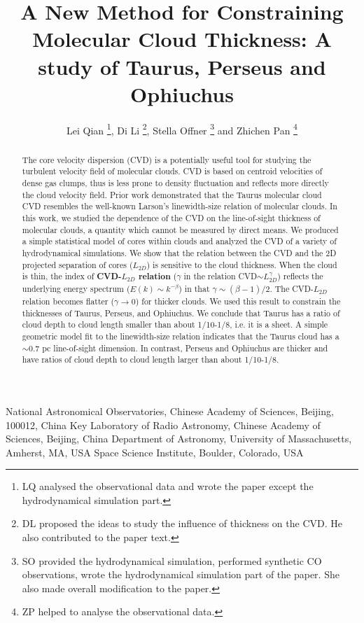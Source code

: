 \documentclass[iop,revtex4]{emulateapj}
\begin{document}
\slugcomment{}

 


\title{A New Method for Constraining Molecular Cloud Thickness: A study of Taurus, Perseus and Ophiuchus}



\author{ Lei Qian \footnote{LQ analysed the observational data and wrote the paper except the hydrodynamical simulation part.}, Di Li   \footnote{DL proposed the ideas to study the influence of thickness on the CVD. He also contributed to the paper text.}, Stella Offner \footnote{SO provided the hydrodynamical simulation, performed synthetic CO observations, wrote the hydrodynamical simulation part of the paper. She also made overall modification to the paper.} and Zhichen Pan \footnote{ZP helped to analyse the observational data.}}
\affil{}  {National Astronomical Observatories,
Chinese Academy of Sciences, Beijing, 100012, China}
 {Key Laboratory of Radio Astronomy, Chinese Academy of Sciences, Beijing, China}
 {Department of Astronomy, University of Massachusetts, Amherst, MA, USA}
 {Space Science Institute, Boulder, Colorado, USA}


\begin{abstract}
The core velocity dispersion (CVD) is a potentially useful tool for studying the turbulent velocity field of molecular clouds. CVD is based on centroid velocities of dense gas clumps, thus is less prone to density fluctuation and reflects more directly the cloud velocity field. Prior work demonstrated that the Taurus molecular cloud CVD resembles the well-known Larson's linewidth-size relation of molecular clouds. In this work, we studied the dependence of the CVD on the line-of-sight thickness of molecular clouds, a quantity which cannot be measured by direct means. We produced a simple statistical model of cores within clouds and analyzed the CVD of a variety of hydrodynamical simulations. We show that the relation between the CVD and the 2D projected separation of cores ($L_{2D}$) is sensitive to the cloud thickness. When the cloud is thin, the index of {\bf CVD-$L_{2D}$ relation} ($\gamma$ in the relation CVD$\sim L_{2D}^{\gamma}$) reflects the underlying energy spectrum ($E(k)\sim k^{-\beta}$) in that $\gamma\sim(\beta-1)/2$. The CVD-$L_{2D}$ relation becomes flatter ($\gamma\to 0$) for thicker clouds. We used this result to constrain the thicknesses of Taurus, Perseus, and Ophiuchus. We conclude that Taurus has a ratio of cloud depth to cloud length smaller than about 1/10-1/8, i.e. it is a sheet. A simple geometric model fit to the linewidth-size relation indicates that the Taurus cloud has a $\sim 0.7$ pc line-of-sight dimension. In contrast, Perseus and Ophiuchus  are thicker and have ratios of cloud depth to cloud length larger than about 1/10-1/8.
\end{abstract}
\end{document}
